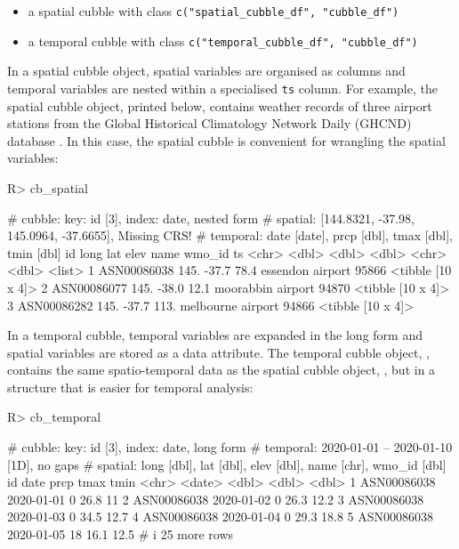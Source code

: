 \documentclass[
  shortnames]{jss}
\providecommand{\tightlist}{%
  \setlength{\itemsep}{0pt}\setlength{\parskip}{0pt}}
\begin{document}
\begin{itemize}
\tightlist
\item
  a spatial cubble with class \texttt{c("spatial\_cubble\_df",\ "cubble\_df")}
\item
  a temporal cubble with class \texttt{c("temporal\_cubble\_df",\ "cubble\_df")}
\end{itemize}

In a spatial cubble object, spatial variables are organised as columns and temporal variables are nested within a specialised \texttt{ts} column. For example, the spatial cubble object,  printed below, contains weather records of three airport stations from the Global Historical Climatology Network Daily (GHCND) database \citep{menne2012overview}. In this case, the spatial cubble is convenient for wrangling the spatial variables:

\begin{CodeChunk}
\begin{CodeInput}
R> cb_spatial
\end{CodeInput}
\begin{CodeOutput}
# cubble:   key: id [3], index: date, nested form
# spatial:  [144.8321, -37.98, 145.0964, -37.6655], Missing CRS!
# temporal: date [date], prcp [dbl], tmax [dbl], tmin [dbl]
  id           long   lat  elev name              wmo_id ts               
  <chr>       <dbl> <dbl> <dbl> <chr>              <dbl> <list>           
1 ASN00086038  145. -37.7  78.4 essendon airport   95866 <tibble [10 x 4]>
2 ASN00086077  145. -38.0  12.1 moorabbin airport  94870 <tibble [10 x 4]>
3 ASN00086282  145. -37.7 113.  melbourne airport  94866 <tibble [10 x 4]>
\end{CodeOutput}
\end{CodeChunk}

In a temporal cubble, temporal variables are expanded in the long form and spatial variables are stored as a data attribute. The temporal cubble object, , contains the same spatio-temporal data as the spatial cubble object, , but in a structure that is easier for temporal analysis:

\begin{CodeChunk}
\begin{CodeInput}
R> cb_temporal
\end{CodeInput}
\begin{CodeOutput}
# cubble:   key: id [3], index: date, long form
# temporal: 2020-01-01 -- 2020-01-10 [1D], no gaps
# spatial:  long [dbl], lat [dbl], elev [dbl], name [chr], wmo_id [dbl]
  id          date        prcp  tmax  tmin
  <chr>       <date>     <dbl> <dbl> <dbl>
1 ASN00086038 2020-01-01     0  26.8  11  
2 ASN00086038 2020-01-02     0  26.3  12.2
3 ASN00086038 2020-01-03     0  34.5  12.7
4 ASN00086038 2020-01-04     0  29.3  18.8
5 ASN00086038 2020-01-05    18  16.1  12.5
# i 25 more rows
\end{CodeOutput}
\end{CodeChunk}
\end{document}
